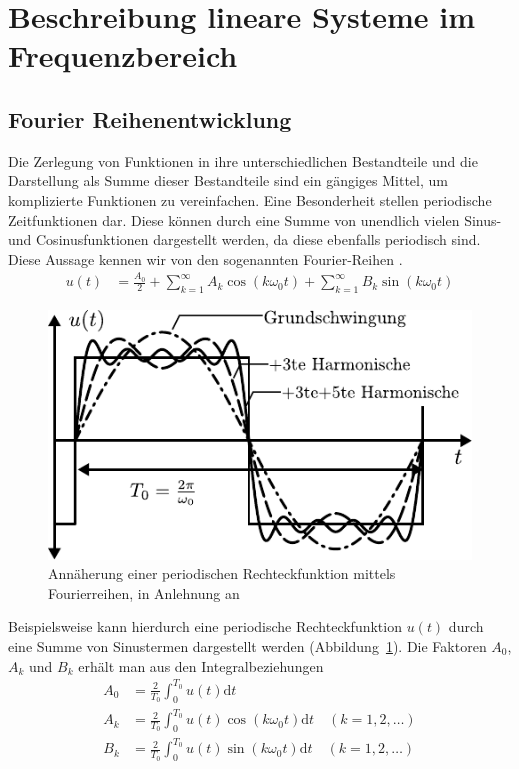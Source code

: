 \section{Beschreibung lineare Systeme im Frequenzbereich}
%
\subsection{Fourier Reihenentwicklung}
%
Die Zerlegung von Funktionen in ihre unterschiedlichen Bestandteile und die Darstellung als Summe dieser Bestandteile sind ein gängiges Mittel, um komplizierte Funktionen zu vereinfachen. Eine Besonderheit stellen periodische Zeitfunktionen dar. Diese können durch eine Summe von unendlich vielen Sinus- und Cosinusfunktionen dargestellt werden, da diese ebenfalls periodisch sind. Diese Aussage kennen wir von den sogenannten
Fourier-Reihen \cite{Furlan08}.
%
\begin{equation}
\begin{aligned}
u(t)&=\frac{A_{0}}{2}+\sum_{k=1}^{\infty}A_{k}\cos(k\omega_{0}t)+\sum_{k=1}^{\infty}B_{k}\sin(k\omega_{0}t)
\end{aligned}
\end{equation}
%
\begin{figure}[h]
	\centering
	\includegraphics[width=0.675\linewidth]{Abbildungen/Modellbildung/PDF/Fourierreihe.pdf}
	\caption{Annäherung einer periodischen Rechteckfunktion mittels Fourierreihen, in Anlehnung an \cite{Lunze10}}
	\label{fig:fourierreihe}
\end{figure}  
%
Beispielsweise kann hierdurch eine periodische Rechteckfunktion $u(t)$ durch eine Summe von Sinustermen dargestellt werden (Abbildung~\ref{fig:fourierreihe}). Die Faktoren $A_{0}$,$A_{k}$ und $B_{k}$ erhält man aus den Integralbeziehungen
%
\begin{equation*}
\begin{aligned}
A_{0}&=\frac{2}{T_{0}}\int_{0}^{T_{0}}u(t)\text{d}t \quad\\
A_{k}&=\frac{2}{T_{0}}\int_{0}^{T_{0}}u(t)          \cos(k\omega_{0}t)\text{d}t \quad (k=1,2,\ldots)\\
B_{k}&=\frac{2}{T_{0}}\int_{0}^{T_{0}}u(t)\sin(k\omega_{0}t)\text{d}t \quad (k=1,2,\ldots)
\end{aligned}
\end{equation*} 
